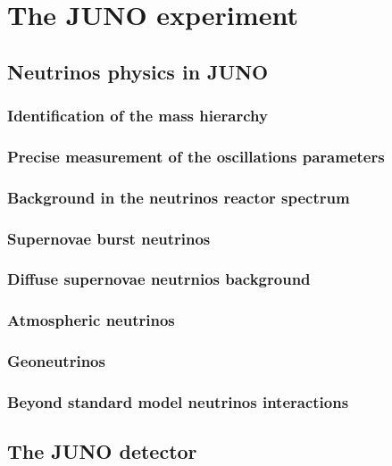 \chapter{The JUNO experiment}

\section{Neutrinos physics in JUNO}

\subsection{Identification of the mass hierarchy}

\subsection{Precise measurement of the oscillations parameters}

\subsection{Background in the neutrinos reactor spectrum}

\subsection{Supernovae burst neutrinos}

\subsection{Diffuse supernovae neutrnios background}

\subsection{Atmospheric neutrinos}

\subsection{Geoneutrinos}

\subsection{Beyond standard model neutrinos interactions}

\section{The JUNO detector}

